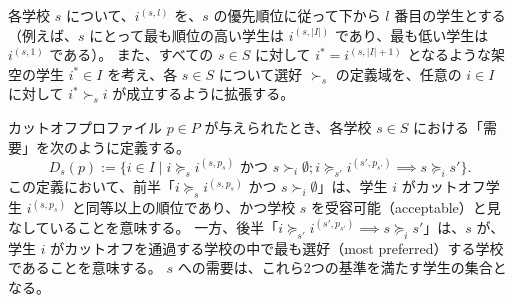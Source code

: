 \documentclass[12pt, a4paper]{article}
\theoremstyle{definition}
\theoremstyle{remark}
\theoremstyle{plain}
\begin{document}
各学校 \( s \) について、\( i^{(s,l)} \) を、\( s \) の優先順位に従って下から \( l \) 番目の学生とする（例えば、\( s \) にとって最も順位の高い学生は \( i^{(s,|I|)} \) であり、最も低い学生は \( i^{(s,1)} \) である）。
また、すべての \( s \in S \) に対して \( i^* = i^{(s,|I|+1)} \) となるような架空の学生 \( i^* \in I \) を考え、各 \( s \in S \) について選好 \( \succ_s \) の定義域を、任意の \( i \in I \) に対して \( i^* \succ_s i \) が成立するように拡張する。

カットオフプロファイル \( p \in P \) が与えられたとき、各学校 \( s \in S \) における「需要」を次のように定義する。
\[
  D_s(p) := \{i \in I \mid i \succeq_s i^{(s,p_s)} \text{ かつ } s \succ_i \emptyset; i \succeq_{s'} i^{(s',p_{s'})} \implies s \succeq_i s' \}.
\]
この定義において、前半「\( i \succeq_s i^{(s,p_s)} \) かつ \( s \succ_i \emptyset \)」は、学生 \( i \) がカットオフ学生 \( i^{(s,p_s)} \) と同等以上の順位であり、かつ学校 \( s \) を受容可能（acceptable）と見なしていることを意味する。
一方、後半「\( i \succeq_{s'} i^{(s',p_{s'})} \implies s \succeq_i s' \)」は、\( s \) が、学生 \( i \) がカットオフを通過する学校の中で最も選好（most preferred）する学校であることを意味する。
\( s \) への需要は、これら2つの基準を満たす学生の集合となる。


\end{document}
